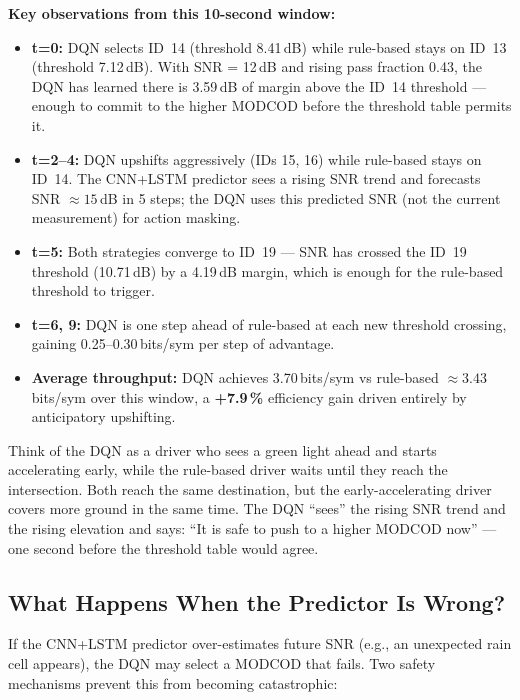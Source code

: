 \documentclass[12pt,a4paper]{report}
\begin{document}
\textbf{Key observations from this 10-second window:}
\begin{itemize}
  \item \textbf{t=0:} DQN selects ID~14 (threshold 8.41\,dB) while
        rule-based stays on ID~13 (threshold 7.12\,dB).  With SNR = 12\,dB
        and rising pass fraction 0.43, the DQN has learned there is
        3.59\,dB of margin above the ID~14 threshold --- enough to commit to
        the higher MODCOD before the threshold table permits it.
  \item \textbf{t=2--4:} DQN upshifts aggressively (IDs 15, 16) while
        rule-based stays on ID~14.  The CNN+LSTM predictor sees a rising SNR
        trend and forecasts SNR $\approx 15$\,dB in 5 steps; the DQN uses
        this predicted SNR (not the current measurement) for action masking.
  \item \textbf{t=5:} Both strategies converge to ID~19 ---  SNR has crossed
        the ID~19 threshold (10.71\,dB) by a 4.19\,dB margin, which is enough
        for the rule-based threshold to trigger.
  \item \textbf{t=6, 9:} DQN is one step ahead of rule-based at each new
        threshold crossing, gaining 0.25--0.30\,bits/sym per step of advantage.
  \item \textbf{Average throughput:} DQN achieves 3.70\,bits/sym vs
        rule-based $\approx 3.43$\,bits/sym over this window, a
        \textbf{+7.9\,\%} efficiency gain driven entirely by anticipatory
        upshifting.
\end{itemize}

\begin{plainenglish}
Think of the DQN as a driver who sees a green light ahead and starts
accelerating early, while the rule-based driver waits until they reach the
intersection.  Both reach the same destination, but the early-accelerating
driver covers more ground in the same time.  The DQN ``sees'' the rising SNR
trend and the rising elevation and says: ``It is safe to push to a higher
MODCOD now'' --- one second before the threshold table would agree.
\end{plainenglish}

\subsection{What Happens When the Predictor Is Wrong?}

If the CNN+LSTM predictor over-estimates future SNR (e.g., an unexpected rain
cell appears), the DQN may select a MODCOD that fails.  Two safety mechanisms
prevent this from becoming catastrophic:
\end{document}
